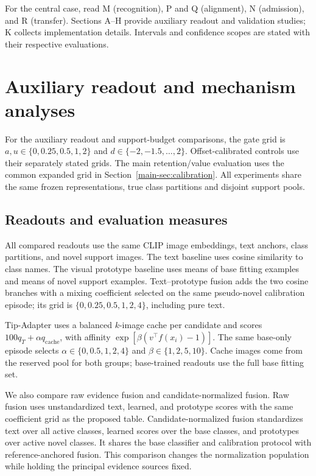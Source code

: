 \documentclass[preprint,review,12pt]{elsarticle}
\begin{document}
For the central case, read M (recognition), P and Q (alignment), N (admission), and R (transfer). Sections A--H provide auxiliary readout and validation studies; K collects implementation details. Intervals and confidence scopes are stated with their respective evaluations.
\clearpage

\section{Auxiliary readout and mechanism analyses}
\label{app:auxiliary}
For the auxiliary readout and support-budget comparisons, the gate grid is $a,u\in\{0,0.25,0.5,1,2\}$ and $d\in\{-2,-1.5,\ldots,2\}$. Offset-calibrated controls use their separately stated grids. The main retention/value evaluation uses the common expanded grid in Section~\ref{main-sec:calibration}. All experiments share the same frozen representations, true class partitions and disjoint support pools.

\subsection{Readouts and evaluation measures}
All compared readouts use the same CLIP image embeddings, text anchors, class partitions, and novel support images. The text baseline uses cosine similarity to class names. The visual prototype baseline uses means of base fitting examples and means of novel support examples. Text--prototype fusion adds the two cosine branches with a mixing coefficient selected on the same pseudo-novel calibration episode; its grid is $\{0,0.25,0.5,1,2,4\}$, including pure text.

Tip-Adapter uses a balanced $k$-image cache per candidate and scores $100q_T+\alpha q_{\mathrm{cache}}$, with affinity $\exp[\beta(v^\top f(x_i)-1)]$. The same base-only episode selects $\alpha\in\{0,0.5,1,2,4\}$ and $\beta\in\{1,2,5,10\}$. Cache images come from the reserved pool for both groups; base-trained readouts use the full base fitting set.

We also compare raw evidence fusion and candidate-normalized fusion. Raw fusion uses unstandardized text, learned, and prototype scores with the same coefficient grid as the proposed table. Candidate-normalized fusion standardizes text over all active classes, learned scores over the base classes, and prototypes over active novel classes. It shares the base classifier and calibration protocol with reference-anchored fusion. This comparison changes the normalization population while holding the principal evidence sources fixed.
\end{document}
